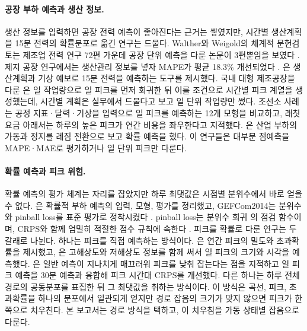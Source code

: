\paragraph{공장 부하 예측과 생산 정보.} 생산 정보를 입력하면 공장 전력 예측이 좋아진다는 근거는 쌓였지만, 시간별 생산계획을 15분 전력의 확률분포로 옮긴 연구는 드물다. Walther와 Weigold의 체계적 문헌검토는 제조업 전력 연구 72편 가운데 공장 단위 예측을 다룬 논문이 3편뿐임을 보였다 \citep{walther2021review}. 제지 공장 연구에서는 생산관리 정보를 넣자 MAPE가 평균 18.3\% 개선되었다 \citep{lai2022papermaking}. \citet{trenz2023production}은 생산계획과 기상 예보로 15분 전력을 예측하는 도구를 제시했다. 국내 대형 제조공장을 다룬 \citet{kim2023c2transformer}은 일 작업량으로 일 피크를 먼저 회귀한 뒤 이를 조건으로 시간별 피크 계열을 생성했는데, 시간별 계획은 실무에서 드물다고 보고 일 단위 작업량만 썼다. 조선소 사례 \citep{lee2026shipyard}는 공정 지표·달력·기상을 입력으로 일 피크를 예측하는 12개 모형을 비교하고, 래칫 요금 아래서는 하루의 높은 피크가 연간 비용을 좌우한다고 지적했다. \citet{berk2018regime}은 산업 부하의 가동과 정지를 레짐 전환으로 보고 확률 예측을 했다. 이 연구들은 대부분 점예측을 MAPE·MAE로 평가하거나 일 단위 피크만 다룬다.

\paragraph{확률 예측과 피크 위험.} 확률 예측의 평가 체계는 자리를 잡았지만 하루 최댓값은 시점별 분위수에서 바로 얻을 수 없다. \citet{hong2016tutorial}은 확률적 부하 예측의 입력, 모형, 평가를 정리했고, GEFCom2014는 분위수와 pinball loss를 표준 평가로 정착시켰다 \citep{hong2016gefcom}. pinball loss는 분위수 회귀 \citep{koenker1978quantiles}의 점검 함수이며, CRPS와 함께 엄밀히 적절한 점수 규칙에 속한다 \citep{gneiting2007scoring}. 피크를 확률로 다룬 연구는 두 갈래로 나뉜다. 하나는 피크를 직접 예측하는 방식이다. \citet{hyndman2010peak}은 연간 피크의 밀도와 초과확률을 제시했고, \citet{amaraouali2023peak}은 고해상도와 저해상도 정보를 함께 써서 일 피크의 크기와 시각을 예측했다. \citet{gilbert2023peaks}은 일반 예측이 지나치게 매끄러워 피크를 낮춰 잡는다는 점을 지적하고 일 피크 예측을 30분 예측과 융합해 피크 시간대 CRPS를 개선했다. 다른 하나는 하루 전체 경로의 공동분포를 표집한 뒤 그 최댓값을 취하는 방식이다. 이 방식은 곡선, 피크, 초과확률을 하나의 분포에서 일관되게 얻지만 경로 잡음의 크기가 맞지 않으면 피크가 한쪽으로 치우친다. 본 보고서는 경로 방식을 택하고, 이 치우침을 가동 상태별 잡음으로 다룬다.


